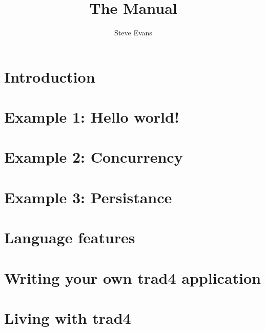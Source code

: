 \documentclass{report}
\begin{document}
\title{The Manual}
\author{Steve Evans}
\maketitle

\chapter{Introduction}

\chapter{Example 1: Hello world!}

\chapter{Example 2: Concurrency}

\chapter{Example 3: Persistance}

\chapter{Language features}

\chapter{Writing your own trad4 application}

\chapter{Living with trad4}
\end{document}
